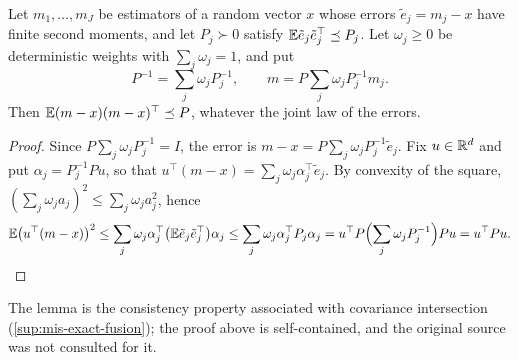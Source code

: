 \begin{lemma}\label{lem:prv-ci}
Let $m_1,\dots,m_J$ be estimators of a random vector $x$ whose errors $\tilde e_j=m_j-x$ have finite second moments, and let $P_j\succ0$ satisfy $\mathbb{E}\tilde e_j\tilde e_j^\top\preceq P_j$. Let $\omega_j\ge0$ be deterministic weights with $\sum_j\omega_j=1$, and put
\[
P^{-1}=\sum_j\omega_jP_j^{-1},\qquad m=P\sum_j\omega_jP_j^{-1}m_j .
\]
Then $\mathbb{E}(m-x)(m-x)^\top\preceq P$, whatever the joint law of the errors.
\end{lemma}

\begin{proof}
Since $P\sum_j\omega_jP_j^{-1}=I$, the error is $m-x=P\sum_j\omega_jP_j^{-1}\tilde e_j$. Fix $u\in\mathbb{R}^d$ and put $\alpha_j=P_j^{-1}Pu$, so that $u^\top(m-x)=\sum_j\omega_j\alpha_j^\top\tilde e_j$. By convexity of the square, $(\sum_j\omega_ja_j)^2\le\sum_j\omega_ja_j^2$, hence
\[
\mathbb{E}\bigl(u^\top(m-x)\bigr)^2\le\sum_j\omega_j\alpha_j^\top\bigl(\mathbb{E}\tilde e_j\tilde e_j^\top\bigr)\alpha_j\le\sum_j\omega_j\alpha_j^\top P_j\alpha_j=u^\top P\Bigl(\sum_j\omega_jP_j^{-1}\Bigr)Pu=u^\top Pu .
\]
\end{proof}

The lemma is the consistency property associated with covariance intersection (\cref{sup:mis-exact-fusion}); the proof above is self-contained, and the original source was not consulted for it.

